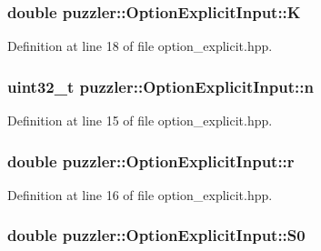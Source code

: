\hypertarget{a00019_a6392346a0097d7dbb1e4bb2a57bd0106}{}
\subsubsection[{K}]{\setlength{\rightskip}{0pt plus 5cm}double puzzler\+::\+Option\+Explicit\+Input\+::\+K}\label{a00019_a6392346a0097d7dbb1e4bb2a57bd0106}


Definition at line 18 of file option\+\_\+explicit.\+hpp.

\hypertarget{a00019_a8229929ea9085758f2b07d660bb7b8f7}{}
\subsubsection[{n}]{\setlength{\rightskip}{0pt plus 5cm}uint32\+\_\+t puzzler\+::\+Option\+Explicit\+Input\+::n}\label{a00019_a8229929ea9085758f2b07d660bb7b8f7}


Definition at line 15 of file option\+\_\+explicit.\+hpp.

\hypertarget{a00019_a861b90050a79636ffc94285b5505b846}{}
\subsubsection[{r}]{\setlength{\rightskip}{0pt plus 5cm}double puzzler\+::\+Option\+Explicit\+Input\+::r}\label{a00019_a861b90050a79636ffc94285b5505b846}


Definition at line 16 of file option\+\_\+explicit.\+hpp.

\hypertarget{a00019_a4a979b31b57f6aed0f4dce571d723058}{}
\subsubsection[{S0}]{\setlength{\rightskip}{0pt plus 5cm}double puzzler\+::\+Option\+Explicit\+Input\+::\+S0}\label{a00019_a4a979b31b57f6aed0f4dce571d723058}


